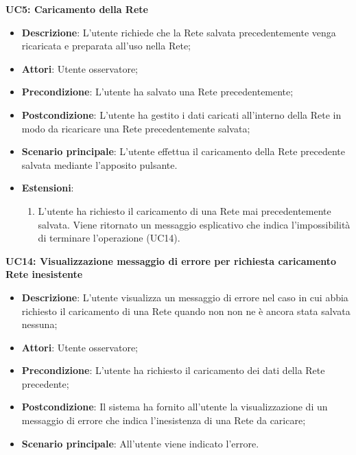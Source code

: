 \textbf{UC5: Caricamento della Rete}\mbox{}
\label{UC5: Caricamento della Rete}
\noindent
\begin{itemize}
\item \textbf{Descrizione}: L'utente richiede che la Rete salvata precedentemente venga ricaricata e preparata all'uso nella Rete;
\item \textbf{Attori}: Utente osservatore;
\item \textbf{Precondizione}: L'utente ha salvato una Rete precedentemente;
\item \textbf{Postcondizione}: L'utente ha gestito i dati caricati all'interno della Rete in modo da ricaricare una Rete precedentemente salvata;
\item \textbf{Scenario principale}: L'utente effettua il caricamento della Rete precedente salvata mediante l'apposito pulsante.
\item \textbf{Estensioni}:
\begin{enumerate}
\item L'utente ha richiesto il caricamento di una Rete mai precedentemente salvata. Viene ritornato un messaggio esplicativo che indica l'impossibilit\`a di terminare l'operazione (UC14).
\end{enumerate}
\end{itemize}

\textbf{UC14: Visualizzazione messaggio di errore per richiesta caricamento Rete inesistente}\mbox{}
\label{UC14: Visualizzazione messaggio di errore per richiesta caricamento Rete inesistente}
\noindent
\begin{itemize}
\item \textbf{Descrizione}: L'utente visualizza un messaggio di errore nel caso in cui abbia richiesto il caricamento di una Rete quando non non ne \`e ancora stata salvata nessuna;
\item \textbf{Attori}: Utente osservatore;
\item \textbf{Precondizione}: L'utente ha richiesto il caricamento dei dati della Rete precedente;
\item \textbf{Postcondizione}: Il sistema ha fornito all'utente la visualizzazione di un messaggio di errore che indica l'inesistenza di una Rete da caricare;
\item \textbf{Scenario principale}: All'utente viene indicato l'errore.
\end{itemize}


